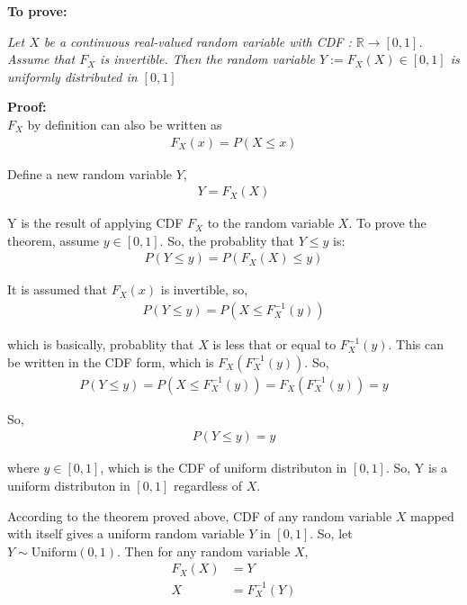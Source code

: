 \begin{solution}



	\textbf{To prove: }

	\emph{Let $X$ be a continuous real-valued random variable with CDF  : $\mathbb{R} \rightarrow [0, 1]$. Assume that
		$F_X$ is invertible. Then the random variable $Y := F_X (X) \in [0, 1]$ is uniformly distributed in $[0, 1]$}

	\textbf{Proof:}\\
	$F_X$ by definition can also be written as
	\begin{align}
		F_X(x) = P(X\leq x)
	\end{align}

	Define a new random variable $Y$,
	\begin{align}
		Y =F_X(X)
	\end{align}

	Y is the result of applying CDF $F_X$ to the random variable $X$. To
	prove the theorem, assume $y\in [0,1]$. So, the probablity that $Y \leq
		y$ is:
	\begin{align}
		P(Y\leq y) = P(F_X(X)\leq y)
	\end{align}

	It is assumed that $F_X(x)$ is invertible, so,
	\begin{align}
		P(Y\leq y) = P(X\leq F_X^{-1}(y))
	\end{align}

	which is basically, probablity that $X$ is less that or equal to $F_X^{-1}(y)$. This can be written in the CDF form, which is $F_X(F_X^{-1}(y))$. So,
	\begin{align}
		P(Y\leq y) = P(X\leq F_X^{-1}(y)) = F_X(F_X^{-1}(y)) = y
	\end{align}

	So,
	\begin{align}
		P(Y\leq y) = y
	\end{align}

	where $y\in [0,1]$, which is the CDF of uniform distributon in $[0,1]$.
	So, Y is a uniform distributon in $[0,1]$ regardless of $X$.


	According to the theorem proved above, CDF of any random variable $X$
	mapped with itself gives a uniform random variable $Y$ in $[0,1]$. So,
	let $Y\sim \text{Uniform}(0,1)$. Then for any random variable $X$,
	\begin{align}
		F_X(X) & = Y           \\
		X      & = F_X^{-1}(Y)
	\end{align}


\end{solution}
